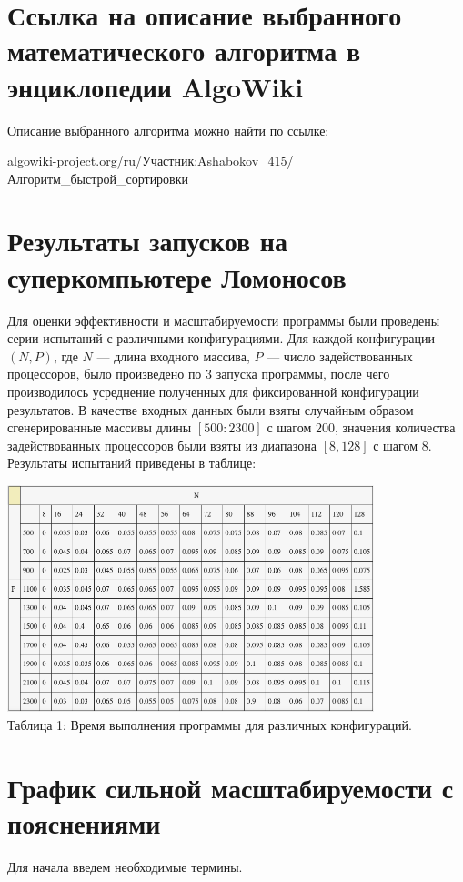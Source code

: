 \documentclass[a4paper, 12pt]{article}
\begin{document}
\section{Ссылка на описание выбранного математического алгоритма в энциклопедии AlgoWiki}
Описание выбранного алгоритма можно найти по ссылке: 

algowiki-project.org/ru/Участник:Ashabokov\_415/Алгоритм\_быстрой\_сортировки 


\section{Результаты запусков на суперкомпьютере Ломоносов}
Для оценки эффективности и масштабируемости программы были проведены серии испытаний с различными конфигурациями. Для каждой конфигурации $(N, P)$, где $N$ --- длина входного массива, $P$ --- число задействованных процессоров, было произведено по $3$ запуска программы, после чего производилось усреднение полученных для фиксированной конфигурации результатов. В качестве входных данных были взяты случайным образом сгенерированные массивы длины $[500 : 2300]$ с шагом $200$, значения количества задействованных процессоров были взяты из диапазона $[8, 128]$ с шагом $8$. Результаты испытаний приведены в таблице:

\begin{center}
\includegraphics[width=0.8\textwidth]{tab_1.png}\\
Таблица 1: Время выполнения программы для различных конфигураций. 
\end{center}

\section{График сильной масштабируемости с пояснениями}
Для начала введем необходимые термины.
\end{document}

